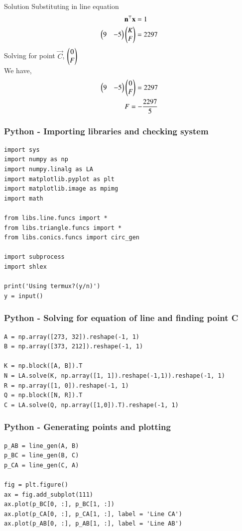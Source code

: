 \documentclass{beamer}
\begin{document}
\begin{frame}{Solution}
Substituting in line equation
\begin{align}
     \mathbf{n}^\top\mathbf{x} &= 1\\
     \begin{pmatrix}9 & -5\end{pmatrix}\begin{pmatrix}K \\ F\end{pmatrix} &= 2297 
\end{align}
Solving for point $\vec{C}$, $\begin{pmatrix}0 \\ F\end{pmatrix}$\\
We have,
\begin{align}
    \begin{pmatrix}9 & -5\end{pmatrix}\begin{pmatrix}0 \\ F\end{pmatrix} = 2297\\
    F = -\frac{2297}{5}
\end{align}
\end{frame}

\begin{frame}[fragile]
    \frametitle{Python - Importing libraries and checking system}
    \begin{lstlisting}
import sys
import numpy as np
import numpy.linalg as LA
import matplotlib.pyplot as plt
import matplotlib.image as mpimg
import math

from libs.line.funcs import *
from libs.triangle.funcs import *
from libs.conics.funcs import circ_gen

import subprocess
import shlex

print('Using termux?(y/n)')
y = input()
\end{lstlisting}
\end{frame}

\begin{frame}[fragile]
    \frametitle{Python - Solving for equation of line and finding point C}
    \begin{lstlisting}
A = np.array([273, 32]).reshape(-1, 1)
B = np.array([373, 212]).reshape(-1, 1)

K = np.block([A, B]).T
N = LA.solve(K, np.array([1, 1]).reshape(-1,1)).reshape(-1, 1)
R = np.array([1, 0]).reshape(-1, 1)
Q = np.block([N, R]).T
C = LA.solve(Q, np.array([1,0]).T).reshape(-1, 1)
\end{lstlisting}
\end{frame}

\begin{frame}[fragile]
    \frametitle{Python - Generating points and plotting}
    \begin{lstlisting}
p_AB = line_gen(A, B)
p_BC = line_gen(B, C)
p_CA = line_gen(C, A)

fig = plt.figure()
ax = fig.add_subplot(111)
ax.plot(p_BC[0, :], p_BC[1, :])
ax.plot(p_CA[0, :], p_CA[1, :], label = 'Line CA')
ax.plot(p_AB[0, :], p_AB[1, :], label = 'Line AB')
\end{lstlisting}
\end{frame}
\end{document}
